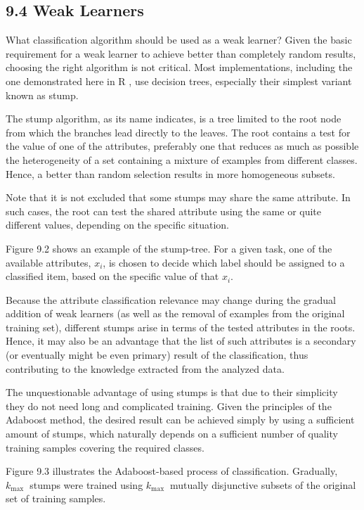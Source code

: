 \documentclass[10pt]{book}
\begin{document}
\subsection*{9.4 Weak Learners}
What classification algorithm should be used as a weak learner? Given the basic requirement for a weak learner to achieve better than completely random results, choosing the right algorithm is not critical. Most implementations, including the one demonstrated here in R , use decision trees, especially their simplest variant known as stump.

The stump algorithm, as its name indicates, is a tree limited to the root node from which the branches lead directly to the leaves. The root contains a test for the value of one of the attributes, preferably one that reduces as much as possible the heterogeneity of a set containing a mixture of examples from different classes. Hence, a better than random selection results in more homogeneous subsets.

Note that it is not excluded that some stumps may share the same attribute. In such cases, the root can test the shared attribute using the same or quite different values, depending on the specific situation.

Figure 9.2 shows an example of the stump-tree. For a given task, one of the available attributes, $x_{i}$, is chosen to decide which label should be assigned to a classified item, based on the specific value of that $x_{i}$.

Because the attribute classification relevance may change during the gradual addition of weak learners (as well as the removal of examples from the original training set), different stumps arise in terms of the tested attributes in the roots. Hence, it may also be an advantage that the list of such attributes is a secondary (or eventually might be even primary) result of the classification, thus contributing to the knowledge extracted from the analyzed data.

The unquestionable advantage of using stumps is that due to their simplicity they do not need long and complicated training. Given the principles of the Adaboost method, the desired result can be achieved simply by using a sufficient amount of stumps, which naturally depends on a sufficient number of quality training samples covering the required classes.

Figure 9.3 illustrates the Adaboost-based process of classification. Gradually, $k_{\text {max }}$ stumps were trained using $k_{\text {max }}$ mutually disjunctive subsets of the original set of training samples.
\end{document}
